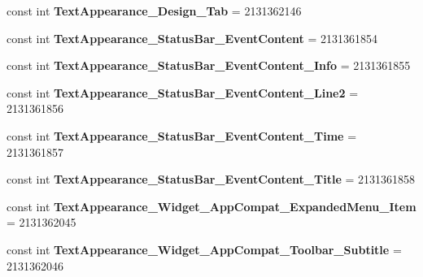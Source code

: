 \begin{DoxyCompactItemize}
const int {\bfseries Text\+Appearance\+\_\+\+Design\+\_\+\+Tab} = 2131362146
\item 
\mbox{\label{class_sample_app_1_1_droid_1_1_resource_1_1_style_ae88ca3fd010c8f5533591a28d91c3567}} 
const int {\bfseries Text\+Appearance\+\_\+\+Status\+Bar\+\_\+\+Event\+Content} = 2131361854
\item 
\mbox{\label{class_sample_app_1_1_droid_1_1_resource_1_1_style_a426aa20beadfdb4d2ec9b850b8874d57}} 
const int {\bfseries Text\+Appearance\+\_\+\+Status\+Bar\+\_\+\+Event\+Content\+\_\+\+Info} = 2131361855
\item 
\mbox{\label{class_sample_app_1_1_droid_1_1_resource_1_1_style_a82bc1496fbddec13858a9468cd580bd3}} 
const int {\bfseries Text\+Appearance\+\_\+\+Status\+Bar\+\_\+\+Event\+Content\+\_\+\+Line2} = 2131361856
\item 
\mbox{\label{class_sample_app_1_1_droid_1_1_resource_1_1_style_a4ae6239894976d82c9f5107adde9db68}} 
const int {\bfseries Text\+Appearance\+\_\+\+Status\+Bar\+\_\+\+Event\+Content\+\_\+\+Time} = 2131361857
\item 
\mbox{\label{class_sample_app_1_1_droid_1_1_resource_1_1_style_a933db520f24d4a62a45b296c046b443a}} 
const int {\bfseries Text\+Appearance\+\_\+\+Status\+Bar\+\_\+\+Event\+Content\+\_\+\+Title} = 2131361858
\item 
\mbox{\label{class_sample_app_1_1_droid_1_1_resource_1_1_style_a2b3089eb900473da2c8330bd73c38e53}} 
const int {\bfseries Text\+Appearance\+\_\+\+Widget\+\_\+\+App\+Compat\+\_\+\+Expanded\+Menu\+\_\+\+Item} = 2131362045
\item 
\mbox{\label{class_sample_app_1_1_droid_1_1_resource_1_1_style_a7070b2ff1ef84b532bdc6fb27c1f6180}} 
const int {\bfseries Text\+Appearance\+\_\+\+Widget\+\_\+\+App\+Compat\+\_\+\+Toolbar\+\_\+\+Subtitle} = 2131362046
\item 
\mbox{\label{class_sample_app_1_1_droid_1_1_resource_1_1_style_ae52b30a30b6c8ea61577b0b8af34f58c}} 

\end{DoxyCompactItemize}

